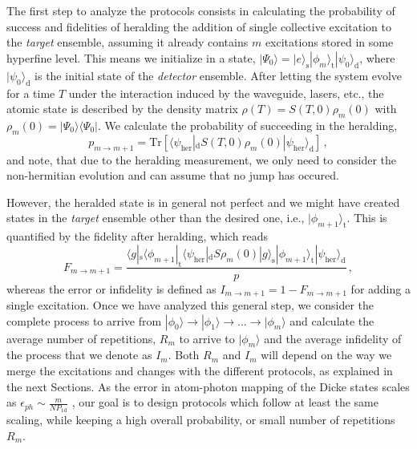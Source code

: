 \documentclass[twocolumn,pra,aps,superscriptaddress,showpacs]{revtex4-1}
\newcommand{\ket}[1]{|#1\rangle}
\newcommand{\bra}[1]{\langle #1|}
\def\oned{\mathrm{1d}}
\newcommand\Tr{\mathrm{Tr}}
\newcommand{\rs}{\mathrm{s}}
\newcommand{\rd}{\mathrm{d}}
\newcommand{\rt}{\mathrm{t}}
\begin{document}
The first step to analyze the protocols consists in calculating the probability of success and fidelities of heralding the addition of single collective excitation to the \emph{target} ensemble, assuming it already contains $m$ excitations stored in some hyperfine level. This means we initialize in a state, $\ket{\Psi_0}=\ket{e}_\rs \ket{\phi_m}_\rt \ket{\psi_0}_\rd$, where $\ket{\psi_0}_\rd$ is the initial state of the \emph{detector} ensemble. After letting the system evolve for a time $T$ under the interaction induced by the waveguide, lasers, etc., the atomic state is described by the density matrix $\rho(T)=S(T,0)\rho_m(0)$ with $\rho_m(0)=\ket{\Psi_0} \bra{\Psi_0}$. We calculate the probability of succeeding in the heralding,
%
\begin{equation}
p_{m\rightarrow m+1}
	=\Tr \left[\bra{\psi_{\mathrm{her}}}_\rd S(T,0) \rho_m(0) \ket{\psi_{\mathrm{her}}}_\rd \right]\,,
\end{equation}
%
and note, that due to the heralding measurement, we only need to consider the non-hermitian evolution and can assume that no jump has occured.

However, the heralded state is in general not perfect and we might have created states in the \emph{target} ensemble other than the desired one, i.e., $\ket{\phi_{m+1}}_\rt$. This is quantified by the fidelity after heralding, which reads
%
\begin{equation}
F_{m\rightarrow m+1}
	=\frac{\bra{g}_\rs\bra{\phi_{m+1}}_\rt \bra{\psi_{\mathrm{her}}}_\rd 
			S\rho_m(0) \ket{g}_\rs \ket{\phi_{m+1}}_\rt \ket{\psi_{\mathrm{her}}}_\rd }{p}\,,
\end{equation}
%
whereas the error or infidelity is defined as $I_{m\rightarrow m+1}=1-F_{m\rightarrow m+1}$ for adding a single excitation. Once we have analyzed this general step, we consider the complete process to arrive from $\ket{\phi_0}\rightarrow \ket{\phi_1}\rightarrow\dots\rightarrow \ket{\phi_m}$ and calculate the average number of repetitions, $R_m$ to arrive to $\ket{\phi_m}$ and the average infidelity of the process that we denote as $I_m$. 
Both $R_m$ and $I_m$ will depend on the way we merge the excitations and changes with the different protocols, as explained in the next Sections. As the error in atom-photon mapping of the Dicke states scales as $\epsilon_{ph} \sim \frac{m}{NP_\oned}$ \cite{gonzaleztudela17a}, our goal is to design protocols which follow at least the same scaling, while keeping a high overall probability, or small number of repetitions $R_m$.
\end{document}
